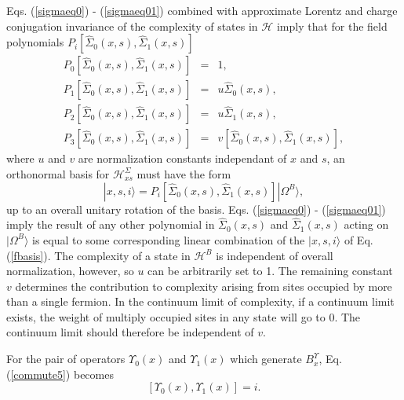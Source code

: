 \documentclass[12pt,amsmath,amssymb,onecolumn]{revtex4-2}
\begin{document}
Eqs. (\ref{sigmaeq0}) - (\ref{sigmaeq01}) combined with
approximate Lorentz and charge conjugation invariance of
the complexity of states in $\mathcal{H}$ imply that
for the field polynomials $P_i[ \hat{\Sigma}_0( x, s), \hat{\Sigma}_1( x, s)]$
\begin{subequations}
  \begin{eqnarray}
    \label{hsigma0}
          P_0[ \hat{\Sigma}_0( x, s), \hat{\Sigma}_1( x, s)] & = & 1, \\
    \label{hsigma1}
          P_1[ \hat{\Sigma}_0( x, s), \hat{\Sigma}_1( x, s)] & = & u \hat{\Sigma}_0( x, s), \\
    \label{hsigma2}
          P_2[ \hat{\Sigma}_0( x, s), \hat{\Sigma}_1( x, s)] & = & u \hat{\Sigma}_1( x, s), \\
    \label{hsigma3}
          P_3[ \hat{\Sigma}_0( x, s), \hat{\Sigma}_1( x, s)] & = & v [\hat{\Sigma}_0( x, s), \hat{\Sigma}_1( x, s)],
  \end{eqnarray}
\end{subequations}
where $u$ and $v$ are normalization constants independant of $x$ and $s$,
an orthonormal basis for $\mathcal{H}^\Sigma_{xs}$ must
have the form
\begin{equation}
  \label{fbasis}
  | x, s, i \rangle  = P_i[ \hat{\Sigma}_0( x, s), \hat{\Sigma}_1( x, s)] |\Omega^B \rangle ,
\end{equation}
up to an overall unitary rotation of the basis.  Eqs. (\ref{sigmaeq0}) - (\ref{sigmaeq01})
imply the result of any other
polynomial in $\hat{\Sigma}_0( x, s)$ and $\hat{\Sigma}_1( x, s)$ acting on $|\Omega^B \rangle $
is equal to some corresponding linear combination of the $|x, s, i \rangle $ of
Eq. (\ref{fbasis}).
The complexity of a state in $\mathcal{H}^B$ is independent of overall normalization,
however, so $u$ can be arbitrarily set to 1. The remaining constant $v$ determines
the contribution to complexity arising from sites occupied by more than a single fermion.
In the continuum limit of complexity, if a continuum limit exists, the weight of
multiply occupied sites in any state will go to 0. The continuum limit
should therefore be independent of $v$. 

For the pair of operators $\Upsilon_0(x)$
and $\Upsilon_1(x)$ which generate $B^\Upsilon_x$,
Eq. (\ref{commute5}) becomes
\begin{equation}
    \label{upseq}
    [\Upsilon_0( x), \Upsilon_1( x)] = i.
\end{equation}
\end{document}
